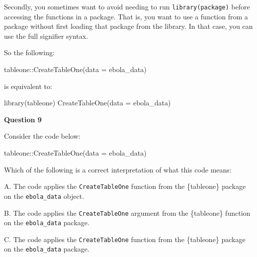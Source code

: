 \documentclass[
  letterpaper,
  DIV=11,
  numbers=noendperiod]{scrreprt}
\newenvironment{Shaded}{\begin{snugshade}}{\end{snugshade}}
\newcommand{\AttributeTok}[1]{\textcolor[rgb]{0.40,0.45,0.13}{#1}}
\newcommand{\FunctionTok}[1]{\textcolor[rgb]{0.28,0.35,0.67}{#1}}
\newcommand{\NormalTok}[1]{\textcolor[rgb]{0.00,0.23,0.31}{#1}}
\newcommand{\SpecialCharTok}[1]{\textcolor[rgb]{0.37,0.37,0.37}{#1}}
\begin{document}
Secondly, you sometimes want to avoid needing to run
\texttt{library(package)} before accessing the functions in a package.
That is, you want to use a function from a package without first loading
that package from the library. In that case, you can use the full
signifier syntax.

So the following:

\begin{Shaded}
\begin{Highlighting}[]
\NormalTok{tableone}\SpecialCharTok{::}\FunctionTok{CreateTableOne}\NormalTok{(}\AttributeTok{data =}\NormalTok{ ebola\_data)}
\end{Highlighting}
\end{Shaded}

is equivalent to:

\begin{Shaded}
\begin{Highlighting}[]
\FunctionTok{library}\NormalTok{(tableone)}
\FunctionTok{CreateTableOne}\NormalTok{(}\AttributeTok{data =}\NormalTok{ ebola\_data)}
\end{Highlighting}
\end{Shaded}

\begin{tcolorbox}[enhanced jigsaw, titlerule=0mm, colback=white, left=2mm, breakable, opacitybacktitle=0.6, colbacktitle=quarto-callout-tip-color!10!white, colframe=quarto-callout-tip-color-frame, bottomtitle=1mm, opacityback=0, coltitle=black, arc=.35mm, toptitle=1mm, title=\textcolor{quarto-callout-tip-color}{\faLightbulb}\hspace{0.5em}{Practice}, leftrule=.75mm, toprule=.15mm, bottomrule=.15mm, rightrule=.15mm]

\textbf{Question 9}

Consider the code below:

\begin{Shaded}
\begin{Highlighting}[]
\NormalTok{tableone}\SpecialCharTok{::}\FunctionTok{CreateTableOne}\NormalTok{(}\AttributeTok{data =}\NormalTok{ ebola\_data)}
\end{Highlighting}
\end{Shaded}

Which of the following is a correct interpretation of what this code
means:

A. The code applies the \texttt{CreateTableOne} function from the
\{tableone\} package on the \texttt{ebola\_data} object.

B. The code applies the \texttt{CreateTableOne} argument from the
\{tableone\} function on the \texttt{ebola\_data} package.

C. The code applies the \texttt{CreateTableOne} function from the
\{tableone\} package on the \texttt{ebola\_data} package.

\end{tcolorbox}
\end{document}
